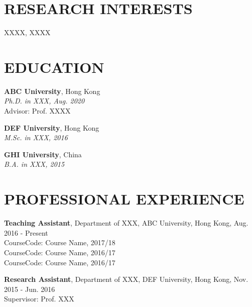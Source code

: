 \documentclass{res} 			%
\begin{document}
 
\thispagestyle{empty} %
\address{ \vspace{0.2in} \\
  Room 123, XXX Building, \\
  No. 88 XXX Street,\\
  Hong Kong, China} 
\address{ \vspace{0.2in} \\
  Tel: +852 1234 5678 \\
  Email: name@domain.com \\
  http://domain.com \\}

\begin{resume} 
\vspace{0.1in}

\section{RESEARCH INTERESTS}
\vspace{0.1in}
	XXXX, XXXX


\section{EDUCATION}
\vspace{0.1in} 
    {\bf ABC University}, Hong Kong \\
    {\sl Ph.D. in XXX, Aug. 2020} \\
    Advisor: Prof. XXXX
    
    {\bf DEF University}, Hong Kong \\
    {\sl M.Sc. in XXX, 2016} 

    {\bf GHI University}, China \\
    {\sl B.A. in XXX, 2015}


\section{PROFESSIONAL EXPERIENCE} 
\vspace{0.1in} 
    {\bf Teaching Assistant}, 
    Department of XXX,
    ABC University, Hong Kong,
    Aug. 2016 - Present \\
    CourseCode: Course Name, 2017/18 \\
    CourseCode: Course Name, 2016/17 \\
    CourseCode: Course Name, 2016/17
    
    {\bf Research Assistant},
    Department of XXX,
    DEF University, Hong Kong,
    Nov. 2015 - Jun. 2016 \\
    Supervisor: Prof. XXX
    

\end{resume}
\end{document}
